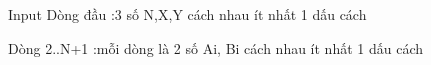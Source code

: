 Input
Dòng đầu :3 số N,X,Y cách nhau ít nhất 1 dấu cách  

   Dòng 2..N+1 :mỗi dòng là 2 số Ai, Bi cách nhau ít nhất 1 dấu cách